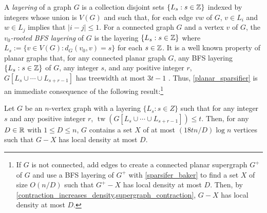 \documentclass{patmorin}
\renewcommand{\le}{\leqslant}
\newcommand{\defin}[1]{\emph{\textcolor{brightmaroon}{#1}}}
\DeclareMathOperator{\tw}{tw}
\begin{document}
A \defin{layering} of a graph $G$ is a collection disjoint sets $\{L_s:s\in\mathbb{Z}\}$ indexed by integers whose union is $V(G)$ and such that, for each edge $vw$ of $G$, $v\in L_i$ and $w\in L_j$ implies that $|i-j|\le 1$.
For a connected graph $G$ and a vertex $v$ of $G$, the \defin{$v_0$-rooted BFS layering} of $G$ is the layering $\{L_s:s\in\mathbb{Z}\}$ where $L_s:=\{v\in V(G): d_G(v_0,v)=s\}$ for each $s\in\mathbb{Z}$. It is a well known property of planar graphs that, for any connected planar graph $G$, any BFS layering $\{L_s:s\in\mathbb{Z}\}$ of $G$, any integer $s$, and any positive integer $r$, $G[L_s\cup\cdots\cup L_{s+r-1}]$ has treewidth at most $3t-1$ \cite{baker:approximation}.  Thus, \cref{planar_sparsifier} is an immediate consequence of the following result:\footnote{If $G$ is not connected, add edges to create a connected planar supergraph $G^+$ of $G$ and use a BFS layering of $G^+$ with \cref{sparsifer_baker} to find a set $X$ of size $O(n/D)$ such that $G^+-X$ has local density at most $D$. Then, by \cref{contraction_increases_density,supergraph_contraction}, $G-X$ has local density at most $D$.}


\begin{lem}\label{sparsifier_baker}
  Let $G$ be an $n$-vertex graph with a layering $\{L_s:s\in Z\}$ such that for any integer $s$ and any positive integer $r$, $\tw(G[L_s\cup\cdots\cup L_{s+r-1}])\le t$.  Then, for any $D\in\mathbb{R}$ with $1\le D\le n$, $G$ contains a set $X$ of at most $(18tn/D)\log n$ vertices such that $G-X$ has local density at most $D$.
\end{lem}
\end{document}
